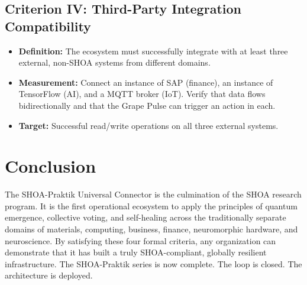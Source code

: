 \documentclass[12pt]{article}
\begin{document}
\subsection{Criterion IV: Third-Party Integration Compatibility}
\begin{itemize}
    \item \textbf{Definition:} The ecosystem must successfully integrate with at least three external, non-SHOA systems from different domains.
    \item \textbf{Measurement:} Connect an instance of SAP (finance), an instance of TensorFlow (AI), and a MQTT broker (IoT). Verify that data flows bidirectionally and that the Grape Pulse can trigger an action in each.
    \item \textbf{Target:} Successful read/write operations on all three external systems.
\end{itemize}

\section{Conclusion}
The SHOA-Praktik Universal Connector is the culmination of the SHOA research program. It is the first operational ecosystem to apply the principles of quantum emergence, collective voting, and self-healing across the traditionally separate domains of materials, computing, business, finance, neuromorphic hardware, and neuroscience. By satisfying these four formal criteria, any organization can demonstrate that it has built a truly SHOA-compliant, globally resilient infrastructure. The SHOA-Praktik series is now complete. The loop is closed. The architecture is deployed.
\end{document}
